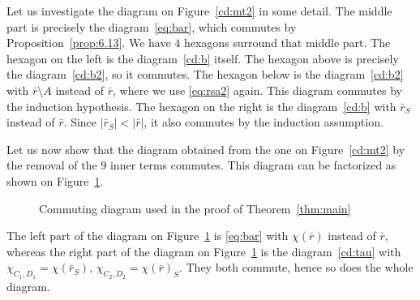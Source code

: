 \documentclass{amsart}[10pt]
\newcommand{\sm}{\setminus}
\newcommand{\tr}{{\bar r}}
\numberwithin{equation}{section}
\numberwithin{figure}{section}
\numberwithin{table}{section}
\begin{document}
Let us investigate the diagram on Figure~\ref{cd:mt2} in some detail. The
middle part is precisely the diagram~\eqref{eq:bar}, which commutes by
Proposition~\ref{prop:6.13}. We have $4$ hexagons surround that middle
part.  The hexagon on the left is the diagram~\eqref{cd:b} itself. The
hexagon above is precisely the diagram~\eqref{cd:b2}, so it
commutes. The hexagon below is the diagram~\eqref{cd:b2} with $\tr\sm
A$ instead of $\tr$, where we use \eqref{eq:rsa2} again. This diagram
commutes by the induction hypothesis. The hexagon on the right is the
diagram~\eqref{cd:b} with $\tr_S$ instead of $\tr$. Since
$|\tr_S|<|\tr|$, it also commutes by the induction assumption.

Let us now show that the diagram obtained from the one on Figure~\ref{cd:mt2} 
by the removal of the $9$ inner terms commutes. This diagram can be factorized 
as shown on Figure~\ref{cdf:mt3}.
\begin{figure}
\caption{Commuting diagram used in the proof of Theorem~\ref{thm:main}}
\label{cdf:mt3}
\end{figure}
The left part of the diagram on Figure~\ref{cdf:mt3} is \eqref{eq:bar} with
$\chi(\tr)$ instead of $\tr$, whereas the right part of the diagram on 
Figure~\ref{cdf:mt3} is the diagram~\eqref{cd:tau} with $\chi_{C_1,D_1}=\chi(\tr_S)$,
$\chi_{C_2,D_2}=\chi(\tr)_S$. They both commute, hence so does the
whole diagram.
\end{document}
